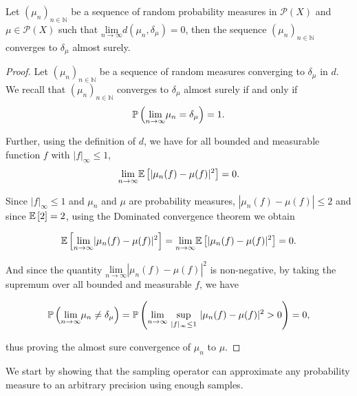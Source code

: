 \begin{lemma}
  Let $(\mu_n)_{n \in \mathbb{N}}$ be a sequence of random probability measures in $\mathcal{P}(X)$ and $\mu \in \mathcal{P}(X)$ such that $\underset{n \rightarrow \infty}{\text{lim}} d(\mu_n, \delta_\mu) = 0$, then the sequence $(\mu_n)_{n \in \mathbb{N}}$ converges to $\delta_\mu$ almost surely.
\end{lemma}
\begin{proof}
  Let $(\mu_n)_{n \in \mathbb{N}}$ be a sequence of random measures converging to $\delta_\mu$ in $d$. We recall that $(\mu_n)_{n \in \mathbb{N}}$ converges to $\delta_\mu$ almost surely if and only if
  \begin{equation*}
    \P\left(\underset{n \rightarrow \infty}{\text{lim}}\mu_n = \delta_\mu\right) = 1.
  \end{equation*}

  Further, using the definition of $d$, we have for all bounded and measurable function $f$ with $|f|_\infty \leq 1$,
  \begin{align*}
    \underset{n \rightarrow \infty}{\text{lim}} \expec{|\mu_n(f) - \mu(f)|^2} = 0.
  \end{align*}

  Since $|f|_\infty \leq 1$ and $\mu_n$ and $\mu$ are probability measures, $|\mu_n(f) - \mu(f)| \leq 2$ and since $\expec{2} = 2$, using the Dominated convergence theorem we obtain

  \begin{equation*}
    \expec{\underset{n \rightarrow \infty}{\text{lim}}|\mu_n(f) - \mu(f)|^2} = \underset{n \rightarrow \infty}{\text{lim}} \expec{|\mu_n(f) - \mu(f)|^2} = 0.
  \end{equation*}

  And since the quantity $\underset{n \rightarrow \infty}{\text{lim}}|\mu_n(f) - \mu(f)|^2$ is non-negative, by taking the supremum over all bounded and measurable $f$, we have

  \begin{equation*}
    \P\left(\underset{n \rightarrow \infty}{\text{lim}} \mu_n \neq \delta_\mu\right) = \P\left(\underset{n \rightarrow \infty}{\text{lim}}\ \underset{|f|_\infty\leq 1}{\text{sup}}\ |\mu_n(f) - \mu(f)|^2 > 0\right) = 0,
  \end{equation*}

  thus proving the almost sure convergence of $\mu_n$ to $\mu$.
\end{proof}

We start by showing that the sampling operator can approximate any probability measure to an arbitrary precision using enough samples.


